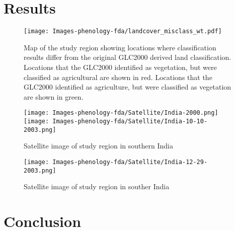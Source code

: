 \section{Results} 

\begin{figure}
	[htbp] \centering 
	\texttt{[image: Images-phenology-fda/landcover\_misclass\_wt.pdf]} \caption{Map of the study region showing locations where classification results differ from the original GLC2000 derived land classification. Locations that the GLC2000 identified as vegetation, but were classified as agricultural are shown in red. Locations that the GLC2000 identified as agriculture, but were classified as vegetation are shown in green.   } 
	\label{fig:classification map} 
\end{figure}

\label{sec:results}
\begin{figure}
	[htbp] \centering 
	\texttt{[image: Images-phenology-fda/Satellite/India-2000.png]} 
	\texttt{[image: Images-phenology-fda/Satellite/India-10-10-2003.png]} \\
	\caption{Satellite image of study region in southern India } 
	
\end{figure}
\begin{figure}
	[htbp] \centering 
	\texttt{[image: Images-phenology-fda/Satellite/India-12-29-2003.png]} \caption{Satellite image of study region in souther India } 
	
\end{figure}

\section{Conclusion} 

\label{sec:conclusion}

